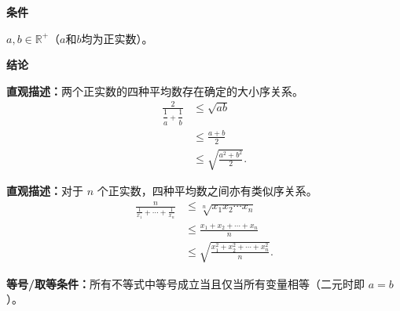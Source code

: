 \begin{statementbox}

\textbf{\textcolor{CStatement}{条件}}
\begin{description}[style=nextline, leftmargin=2.8em, labelsep=0.5em, itemsep=0.35em]
    \item[\textbf{\textcolor{CStatement}{条件 1（正实数）：}}] $a, b \in \mathbb{R}^{+}$（$a$和$b$均为正实数）。
\end{description}

\textbf{\textcolor{CStatement}{结论}}
\begin{description}[style=nextline, leftmargin=2.8em, labelsep=0.5em, itemsep=0.45em]
    \item[\textbf{\textcolor{CStatement}{结论一（四均值不等式链）：}}]
    \textbf{\textcolor{CStatement}{直观描述：}}两个正实数的四种平均数存在确定的大小序关系。
    \[
    \begin{aligned}
    \frac{2}{\dfrac{1}{a}+\dfrac{1}{b}} &\leq \sqrt{ab} \\
    &\leq \frac{a+b}{2} \\
    &\leq \sqrt{\frac{a^{2}+b^{2}}{2}}.
    \end{aligned}
    \]

    \item[\textbf{\textcolor{CStatement}{推广结论（n 元不等式链）：}}]
    \textbf{\textcolor{CStatement}{直观描述：}}对于 $n$ 个正实数，四种平均数之间亦有类似序关系。
    \[
    \begin{aligned}
    \frac{n}{\frac{1}{x_1}+\cdots+\frac{1}{x_n}} &\leq \sqrt[n]{x_1 x_2 \cdots x_n} \\
    &\leq \frac{x_1+x_2+\cdots+x_n}{n} \\
    &\leq \sqrt{\frac{x_1^2+x_2^2+\cdots+x_n^2}{n}}.
    \end{aligned}
    \]
\end{description}

\textbf{\textcolor{CStatement}{等号/取等条件：}}所有不等式中等号成立当且仅当所有变量相等（二元时即 $a = b$）。

\end{statementbox}
